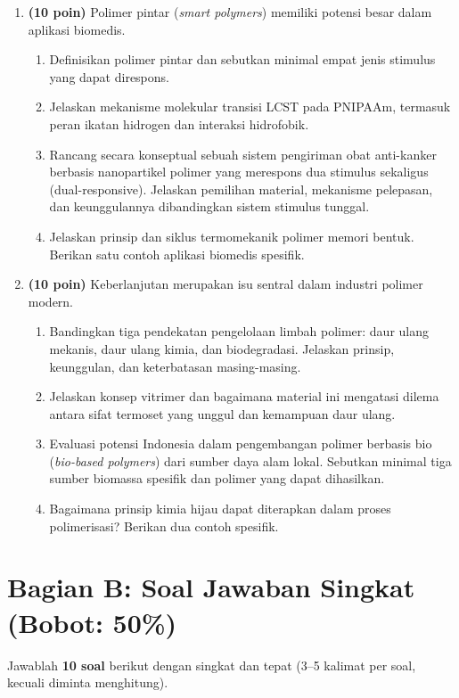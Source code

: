 \documentclass[12pt,a4paper,openany]{book}
\begin{document}
\begin{enumerate}
\item \textbf{(10 poin)} Polimer pintar (\textit{smart polymers}) memiliki potensi besar dalam aplikasi biomedis.
\begin{enumerate}[label=(\alph*)]
\item Definisikan polimer pintar dan sebutkan minimal empat jenis stimulus yang dapat direspons.
\item Jelaskan mekanisme molekular transisi LCST pada PNIPAAm, termasuk peran ikatan hidrogen dan interaksi hidrofobik.
\item Rancang secara konseptual sebuah sistem pengiriman obat anti-kanker berbasis nanopartikel polimer yang merespons dua stimulus sekaligus (dual-responsive). Jelaskan pemilihan material, mekanisme pelepasan, dan keunggulannya dibandingkan sistem stimulus tunggal.
\item Jelaskan prinsip dan siklus termomekanik polimer memori bentuk. Berikan satu contoh aplikasi biomedis spesifik.
\end{enumerate}

\item \textbf{(10 poin)} Keberlanjutan merupakan isu sentral dalam industri polimer modern.
\begin{enumerate}[label=(\alph*)]
\item Bandingkan tiga pendekatan pengelolaan limbah polimer: daur ulang mekanis, daur ulang kimia, dan biodegradasi. Jelaskan prinsip, keunggulan, dan keterbatasan masing-masing.
\item Jelaskan konsep vitrimer dan bagaimana material ini mengatasi dilema antara sifat termoset yang unggul dan kemampuan daur ulang.
\item Evaluasi potensi Indonesia dalam pengembangan polimer berbasis bio (\textit{bio-based polymers}) dari sumber daya alam lokal. Sebutkan minimal tiga sumber biomassa spesifik dan polimer yang dapat dihasilkan.
\item Bagaimana prinsip kimia hijau dapat diterapkan dalam proses polimerisasi? Berikan dua contoh spesifik.
\end{enumerate}

\end{enumerate}

\section*{Bagian B: Soal Jawaban Singkat (Bobot: 50\%)}

Jawablah \textbf{10 soal} berikut dengan singkat dan tepat (3--5 kalimat per soal, kecuali diminta menghitung).
\end{document}
